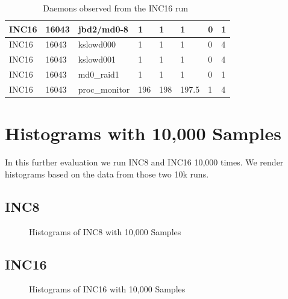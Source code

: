 \begin{table}[h]
\begin{center}
{\begin{tabular}{l|l|l|l|l|l|l|l}
INC16     & 16043     & jbd2/md0-8     & 1     & 1     & 1     & 0     & 1\\ \hline
INC16     & 16043     & kslowd000     & 1     & 1     & 1     & 0     & 4\\ \hline
INC16     & 16043     & kslowd001     & 1     & 1     & 1     & 0     & 4\\ \hline
INC16     & 16043     & md0\_raid1     & 1     & 1     & 1     & 0     & 1\\ \hline
INC16     & 16043     & proc\_monitor     & 196     & 198     & 197.5     & 1     & 4\\ \hline \hline

\end{tabular}
}
\end{center}
\caption{Daemons observed from the INC16 run~\label{tab:inc16_daemons}}
\end{table}

\pagebreak
\section{Histograms with 10,000 Samples~\label{sec:10k_hist}}  
In this further evaluation we run INC8 and INC16 10,000 times. 
We render histograms based on the data from those two 10k runs. 

\subsection{INC8}

\begin{figure}[hp!]
	\centering
	\caption{Histograms of INC8 with 10,000 Samples~\label{fig:inc8_10k}}
\end{figure}

\subsection{INC16}

\begin{figure}[hp!]
	\centering
	\caption{Histograms of INC16 with 10,000 Samples~\label{fig:inc16_10k}}
\end{figure}

